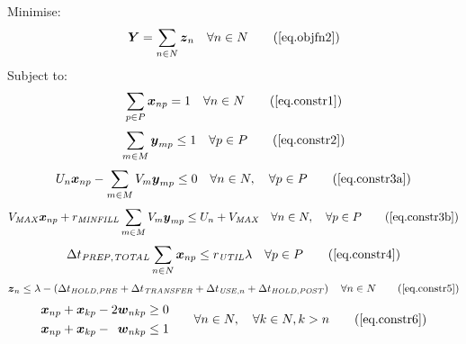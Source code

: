 Minimise:
\begin{equation}
    \boldsymbol{Y} = \sum_{n \in N} \boldsymbol{z}_{n} \quad \forall n \in N
    \tag{\ref{eq.objfn2}}
\end{equation}
Subject to:
\begin{equation}
    \sum_{p \in P} \boldsymbol{x}_{np} = 1 \quad \forall n \in N
    \tag{\ref{eq.constr1}}
\end{equation}
\begin{equation}
    \sum_{m \in M} \boldsymbol{y}_{mp} \le 1 \quad \forall p \in P
    \tag{\ref{eq.constr2}}
\end{equation}
\begin{equation}
    U_{n} \boldsymbol{x}_{np} - \sum_{m \in M} V_{m} \boldsymbol{y}_{mp} \le 0
    \quad \forall n \in N, \quad \forall p \in P
    \tag{\ref{eq.constr3a}}
\end{equation}
\begin{equation}
    V_{\mathit{MAX}} \boldsymbol{x}_{np} + r_{\mathit{MINFILL}} \sum_{m \in M}
    V_{m} \boldsymbol{y}_{mp} \le U_{n} + V_{\mathit{MAX}} \quad \forall n \in
    N, \quad \forall p \in P
    \tag{\ref{eq.constr3b}}
\end{equation}
\begin{equation}
    \Delta t_{\mathit{PREP,TOTAL}} \sum_{n \in N} \boldsymbol{x}_{np} \le 
    r_{\mathit{UTIL}} \lambda \quad \forall p \in P
    \tag{\ref{eq.constr4}}
\end{equation}
\begin{equation}
    \boldsymbol{z}_{n} \le \lambda - \left( \Delta t_{\mathit{HOLD,PRE}} +
    \Delta t_{\mathit{TRANSFER}} + \Delta t_{\mathit{USE},n} + \Delta
    t_{\mathit{HOLD,POST}} \right) \quad \forall n \in N
    \tag{\ref{eq.constr5}}
\end{equation}
\begin{equation}
    \begin{split}
        \begin{alignedat}{3}
            \boldsymbol{x}_{np} & {}+{} & \boldsymbol{x}_{kp} & {}-{} & 2
            \boldsymbol{w}_{nkp} & \ge 0\\
            \boldsymbol{x}_{np} & {}+{} & \boldsymbol{x}_{kp} & {}-{} &
            \boldsymbol{w}_{nkp} & \le 1\\
        \end{alignedat}
    \end{split}
    \quad\quad
    \begin{split}
        \forall n \in N, \quad \forall k \in N, k > n
    \end{split}
    \tag{\ref{eq.constr6}}
\end{equation}
